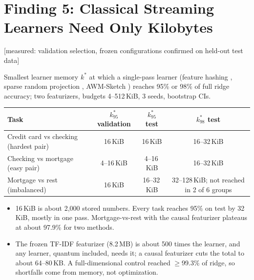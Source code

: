 \documentclass[10pt]{article}
\newcommand{\evlabel}[1]{\textsf{\small[#1]}}
\newenvironment{sectionblock}
{%
    \par
    \vspace{2pt}
    \noindent
    \begin{minipage}{\textwidth}
}
{%
    \end{minipage}
    \par
    \vspace{5pt}
}
\begin{document}
\begin{sectionblock}

\section{Finding 5: Classical Streaming Learners Need Only Kilobytes}
\label{sec:f5}

\evlabel{measured: validation selection, frozen configurations confirmed on held-out test data}

\vspace{2pt}
Smallest learner memory $k^{*}$ at which a single-pass learner (feature hashing \cite{weinberger2009}, sparse random projection \cite{kane2014}, AWM-Sketch \cite{tai2018}) reaches 95\% or 98\% of full ridge accuracy; two featurizers, budgets 4--512\,KiB, 3 seeds, bootstrap CIs.

\vspace{2pt}
\begin{center}
\small
\begin{tabularx}{\textwidth}{@{}lCCC@{}}
\toprule
\textbf{Task} & \textbf{$k^{*}_{95}$ validation} & \textbf{$k^{*}_{95}$ test} & \textbf{$k^{*}_{98}$ test} \\
\midrule
Credit card vs checking (hardest pair) & 16\,KiB & 16\,KiB & 16--32\,KiB \\
Checking vs mortgage (easy pair) & 4--16\,KiB & 4--16\,KiB & 16--32\,KiB \\
Mortgage vs rest (imbalanced) & 16\,KiB & 16--32\,KiB & 32--128\,KiB; not reached in 2 of 6 groups \\
\bottomrule
\end{tabularx}
\end{center}

\begin{itemize}
    \item 16\,KiB is about 2{,}000 stored numbers. Every task reaches 95\% on test by 32\,KiB, mostly in one pass. Mortgage-vs-rest with the causal featurizer plateaus at about 97.9\% for two methods.
    \item The frozen TF-IDF featurizer (8.2\,MB) is about 500 times the learner, and any learner, quantum included, needs it; a causal featurizer cuts the total to about 64--80\,KB. A full-dimensional control reached $\ge$99.3\% of ridge, so shortfalls come from memory, not optimization.
\end{itemize}

\end{sectionblock}
\end{document}
